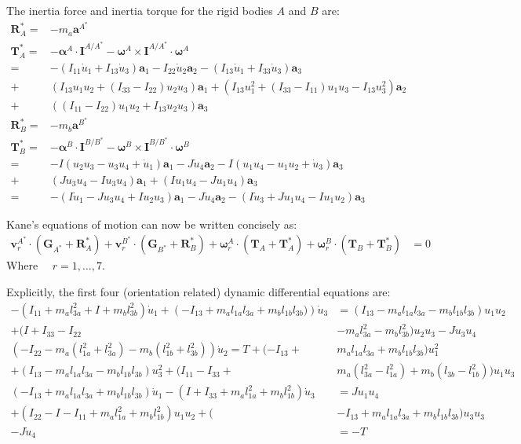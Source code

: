 \documentclass[letterpaper,11pt]{article}
\newcommand{\bs}[1]{ \boldsymbol{ #1 } }
\begin{document}
The inertia force and inertia torque for the rigid bodies $A$ and $B$ are:
\begin{align*}
  \bs{R}^*_A  =& -m_a \bs{a}^{A^*} \\
  \bs{T}^*_A  =& -\bs{\alpha}^A \cdot \bs{I}^{A/A^*} - \bs{\omega}^A \times
  \bs{I}^{A/A^*} \cdot \bs{\omega}^A \\
  = &-(I_{11}\dot{u}_1 + I_{13}\dot{u}_3)\bs{a}_1 - I_{22}\dot{u}_2\bs{a}_2 -
  (I_{13}\dot{u}_1 + I_{33}\dot{u}_3)\bs{a}_3 \\
   + & (I_{13}u_1u_2 + (I_{33} - I_{22})u_2u_3)\bs{a}_1 +
  (I_{13}u_1^2 + (I_{33}- I_{11})u_1u_3 - I_{13}u_3^2)\bs{a}_2 \\
  + & ((I_{11} - I_{22})u_1u_2 + I_{13}u_2u_3)\bs{a}_3 \\
  \bs{R}^*_B = & -m_b \bs{a}^{B^*} \\
  \bs{T}^*_B = & -\bs{\alpha}^B \cdot \bs{I}^{B/B^*} - \bs{\omega}^B \times
  \bs{I}^{B/B^*} \cdot \bs{\omega}^B \\
  = & -I(u_2u_3 - u_3u_4 + \dot{u}_1)\bs{a}_1 - J\dot{u}_4\bs{a}_2 - I(u_1u_4 - u_1u_2 +
  \dot{u}_3)\bs{a}_3 \\
  + & (Ju_3u_4 - Iu_3u_4)\bs{a}_1 + (Iu_1u_4 - Ju_1u_4)\bs{a}_3 \\
  = &-(I\dot{u}_1 - Ju_3u_4 + Iu_2u_3)\bs{a}_1 - J\dot{u}_4\bs{a}_2 -
  (I\dot{u}_3 + Ju_1u_4 - Iu_1u_2)\bs{a}_3
\end{align*}

Kane's equations of motion can now be written concisely as:
\begin{align*}
  \bs{v}^{A^*}_r \cdot (\bs{G}_{A^*} + \bs{R}^*_A) +
  \bs{v}^{B^*}_r \cdot (\bs{G}_{B^*} + \bs{R}^*_B) +
  \bs{\omega}^A_r \cdot (\bs{T}_A + \bs{T}^*_A) +
  \bs{\omega}^B_r \cdot (\bs{T}_B + \bs{T}^*_B) & = 0
\end{align*}
Where $\quad r = 1,\dots,7$.

Explicitly, the first four (orientation related) dynamic differential equations are:
\begin{align*}
  -\left(I_{11} + m_al_{3a}^2 + I + m_bl_{3b}^2\right)\dot{u}_{1}
  + \left(-I_{13} + m_al_{1a}l_{3a} + m_bl_{1b}l_{3b})\right)\dot{u}_{3}
  & =
  (I_{13}  - m_al_{1a}l_{3a} - m_bl_{1b}l_{3b})u_1u_2\\
  + (I + I_{33} - I_{22}& - m_al_{3a}^2 - m_bl_{3b}^2)u_2u_3 - Ju_3u_4
  \\
(-I_{22} - m_a(l_{1a}^2 + l_{3a}^2) - m_b(l_{1b}^2 + l_{3b}^2)) \dot{u}_2
  =
  T
  +(-I_{13} + &m_al_{1a}l_{3a} + m_bl_{1b}l_{3b})u_1^2 \\
  + (I_{13} - m_al_{1a}l_{3a} - m_bl_{1b}l_{3b})u_3^2 +
  (I_{11} - I_{33} + &m_a(l_{3a}^2 - l_{1a}^2)
  + m_b(l_{3b} - l_{1b}^2))u_1u_3 
  \\
  (-I_{13} + m_al_{1a}l_{3a} + m_bl_{1b}l_{3b}) \dot{u}_1 - (I + I_{33} +
  m_al_{1a}^2 + m_bl_{1b}^2) \dot{u}_3
  & = Ju_1u_4
  \\
  + (I_{22} - I - I_{11} + m_al_{1a}^2 + m_bl_{1b}^2)u_1u_2 + (&-I_{13} + m_al_{1a}l_{3a} + m_bl_{1b}l_{3b})u_3u_3
  \\
  -J\dot{u}_4 &=  -T
\end{align*}
\end{document}
